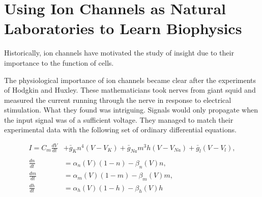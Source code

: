 



\section{Using Ion Channels as Natural Laboratories to Learn Biophysics}

Historically, ion channels have motivated the study of insight due to their importance to the function of cells.

The physiological importance of ion channels became clear after the experiments of Hodgkin and Huxley. These mathematicians took nerves from giant squid and measured the current running through the nerve in response to electrical stimulation. What they found was intriguing. Signals would only propagate when the input signal was of a sufficient voltage. They managed to match their experimental data with the following set of ordinary differential equations.

\begin{equation}
	\label{hh_equations}
\begin{aligned}
	I = C_m \frac{dV}{dt} &+ \bar{g}_K n^4 (V - V_K) + \bar{g}_{Na} m^3 h (V - V_{Na} ) + \bar{g}_l (V-V_l) ,  \\ \\
	\frac{dn}{dt} &= \alpha_n(V)  (1-n) - \beta_n(V)  n, \\
	\frac{dm}{dt} &= \alpha_m(V)  (1-m) - \beta_m(V)  m, \\ 
	\frac{dh}{dt} &= \alpha_h(V)  (1-h) - \beta_h(V)  h  
\end{aligned}
\end{equation}

